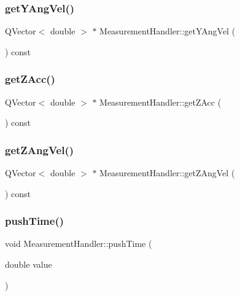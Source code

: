 \subsubsection{\texorpdfstring{get\+Y\+Ang\+Vel()}{getYAngVel()}}
{\footnotesize\ttfamily Q\+Vector$<$ double $>$ $\ast$ Measurement\+Handler\+::get\+Y\+Ang\+Vel (\begin{DoxyParamCaption}{ }\end{DoxyParamCaption}) const}

\mbox{\label{class_measurement_handler_aa9429cbbd110d64168635e9325dcf487}} 
\subsubsection{\texorpdfstring{get\+Z\+Acc()}{getZAcc()}}
{\footnotesize\ttfamily Q\+Vector$<$ double $>$ $\ast$ Measurement\+Handler\+::get\+Z\+Acc (\begin{DoxyParamCaption}{ }\end{DoxyParamCaption}) const}

\mbox{\label{class_measurement_handler_a89631c6b8b3ba7c1aab620bdcf595896}} 
\subsubsection{\texorpdfstring{get\+Z\+Ang\+Vel()}{getZAngVel()}}
{\footnotesize\ttfamily Q\+Vector$<$ double $>$ $\ast$ Measurement\+Handler\+::get\+Z\+Ang\+Vel (\begin{DoxyParamCaption}{ }\end{DoxyParamCaption}) const}

\mbox{\label{class_measurement_handler_a95dad9123275dbb03f9cd01852e82df5}} 
\subsubsection{\texorpdfstring{push\+Time()}{pushTime()}}
{\footnotesize\ttfamily void Measurement\+Handler\+::push\+Time (\begin{DoxyParamCaption}\item[{double}]{value }\end{DoxyParamCaption})}


